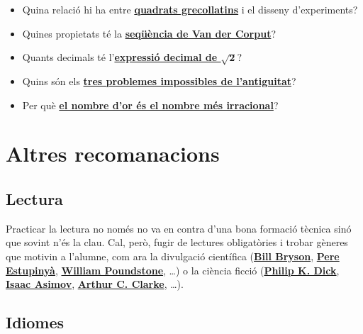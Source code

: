 \documentclass[a4paper, 12pt]{article}
\begin{document}
\begin{itemize}
            \item Quina relació hi ha entre \href{https://ca.wikipedia.org/wiki/Quadrat_grecollat\%C3\%AD}{\textbf{quadrats grecollatins}} i el disseny d'experiments?
            \item Quines propietats té la \href{https://en.wikipedia.org/wiki/Van_der_Corput_sequence}{\textbf{seqüència de Van der Corput}}?
            \item Quants decimals té l'\href{https://ca.wikipedia.org/wiki/Arrel_quadrada_de_2}{\textbf{expressió decimal de $\mathbf{\sqrt{2}}$}}?
            \item Quins són els \href{https://ca.wikipedia.org/wiki/Construcci\%C3\%B3_amb_regle_i_comp\%C3\%A0s#Construccions_impossibles}{\textbf{tres problemes impossibles de l'antiguitat}}?
            \item Per què \href{https://en.wikipedia.org/wiki/Continued_fraction#A_property_of_the_golden_ratio_\%CF\%86}{\textbf{el nombre d'or és el nombre més irracional}}? 
        \end{itemize}

    \newpage %
    
    \section*{Altres recomanacions}

        \subsection*{Lectura}

            Practicar la lectura no només no va en contra d'una bona formació tècnica sinó que sovint n'és la clau. Cal, però, fugir de lectures obligatòries i trobar gèneres que motivin a l'alumne, com ara la divulgació científica (\href{https://ca.wikipedia.org/wiki/Bill_Bryson}{\textbf{Bill Bryson}}, \href{https://ca.wikipedia.org/wiki/Pere_Estupiny\%C3\%A0}{\textbf{Pere Estupinyà}}, \href{https://en.wikipedia.org/wiki/William_Poundstone}{\textbf{William Poundstone}}, \dots) o la ciència ficció (\href{https://ca.wikipedia.org/wiki/Philip_K._Dick}{\textbf{Philip K. Dick}}, \href{https://ca.wikipedia.org/wiki/Isaac_Asimov}{\textbf{Isaac Asimov}}, \href{https://ca.wikipedia.org/wiki/Arthur_C._Clarke}{\textbf{Arthur C. Clarke}}, \dots).

        \subsection*{Idiomes}
\end{document}
